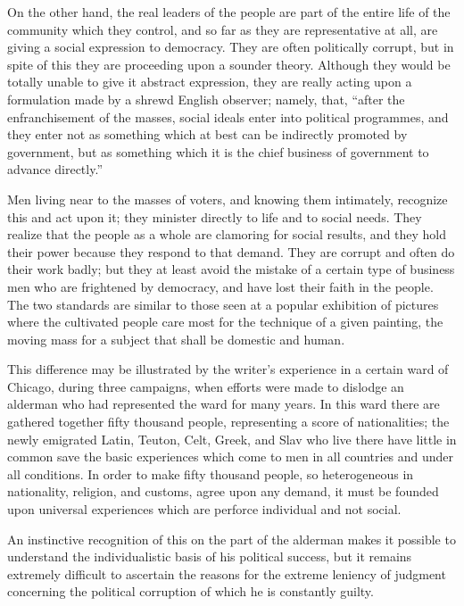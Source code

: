 \documentclass[]{article}
\begin{document}
\begin{sectionbody}
\addamsparagraph On the other hand, the real leaders of the people are part of the entire
life of the community which they control, and so far as they are
representative at all, are giving a social expression to democracy. They
are often politically corrupt, but in spite of this they are proceeding
upon a sounder theory. Although they would be totally unable to give it
abstract expression, they are really acting upon a formulation made by a
shrewd English observer; namely, that, ``after the enfranchisement of the
masses, social ideals enter into political programmes, and they enter
not as something which at best can be indirectly promoted by government,
but as something which it is the chief business of government to advance
directly.''

\addamsparagraph Men living near to the masses of voters, and knowing them intimately,
recognize this and act upon it; they minister directly to life and to
social needs. They realize that the people as a whole are clamoring for
social results, and they hold their power because they respond to that
demand. They are corrupt and often do their work badly; but they at
least avoid the mistake of a certain type of business men who are
frightened by democracy, and have lost their faith in the people. The
two standards are similar to those seen at a popular exhibition of
pictures where the cultivated people care most for the technique of a
given painting, the moving mass for a subject that shall be domestic and
human.

\addamsparagraph This difference may be illustrated by the writer's experience in a
certain ward of Chicago, during three campaigns, when efforts were made
to dislodge an alderman who had represented the ward for many years. In
this ward there are gathered together fifty thousand people,
representing a score of nationalities; the newly emigrated Latin,
Teuton, Celt, Greek, and Slav who live there have little in common save
the basic experiences which come to men in all countries and under all
conditions. In order to make fifty thousand people, so heterogeneous in
nationality, religion, and customs, agree upon any demand, it must be
founded upon universal experiences which are perforce individual and not
social.

\addamsparagraph An instinctive recognition of this on the part of the alderman makes it
possible to understand the individualistic basis of his political
success, but it remains extremely difficult to ascertain the reasons for
the extreme leniency of judgment concerning the political corruption of
which he is constantly guilty.


\end{sectionbody}
\end{document}
